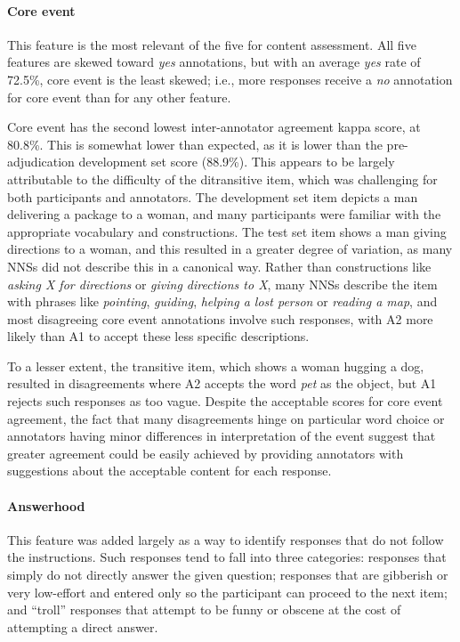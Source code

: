 \documentclass[11pt,a4paper]{article}
\begin{document}
\paragraph{Core event} This feature is the most relevant of the five for content assessment. All five features are skewed toward \textit{yes} annotations, but with an average \textit{yes} rate of 72.5\%, core event is the least skewed; i.e., more responses receive a \textit{no} annotation for core event than for any other feature.

Core event has the second lowest inter-annotator agreement kappa score, at 80.8\%. This is somewhat lower than expected, as it is lower than the pre-adjudication development set score (88.9\%). This appears to be largely attributable to the difficulty of the ditransitive item, which was challenging for both participants and annotators. The development set item depicts a man delivering a package to a woman, and many participants were familiar with the appropriate vocabulary and constructions. The test set item shows a man giving directions to a woman, and this resulted in a greater degree of variation, as many NNSs did not describe this in a canonical way.  Rather than constructions like \textit{asking X for directions} or \textit{giving directions to X}, many NNSs describe the item with phrases like \textit{pointing}, \textit{guiding}, \textit{helping a lost person} or \textit{reading a map}, and most disagreeing core event annotations involve such responses, with A2 more likely than A1 to accept these less specific descriptions.

To a lesser extent, the transitive item, which shows a woman hugging a dog, resulted in disagreements where A2 accepts the word \textit{pet} as the object, but A1 rejects such responses as too vague. Despite the acceptable scores for core event agreement, the fact that many disagreements hinge on particular word choice or annotators having minor differences in interpretation of the event suggest that greater agreement could be easily achieved by providing annotators with suggestions about the acceptable content for each response. 

\paragraph{Answerhood} This feature was added largely as a way to identify responses that do not follow the instructions. Such responses tend to fall into three categories: responses that simply do not directly answer the given question; responses that are gibberish or very low-effort and entered only so the participant can proceed to the next item; and ``troll'' responses that attempt to be funny or obscene at the cost of attempting a direct answer.
\end{document}
